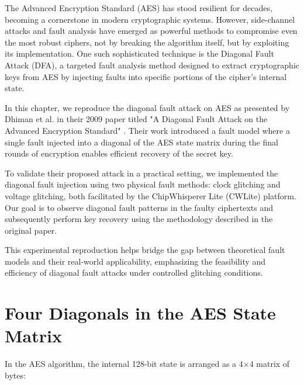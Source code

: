 

The Advanced Encryption Standard (AES) has stood resilient for decades, becoming a cornerstone in modern cryptographic systems. However, side-channel attacks and fault analysis have emerged as powerful methods to compromise even the most robust ciphers, not by breaking the algorithm itself, but by exploiting its implementation. One such sophisticated technique is the Diagonal Fault Attack (DFA), a targeted fault analysis method designed to extract cryptographic keys from AES by injecting faults into specific portions of the cipher’s internal state.

In this chapter, we reproduce the diagonal fault attack on AES as presented by Dhiman et al. in their 2009 paper titled "A Diagonal Fault Attack on the Advanced Encryption Standard" \cite{Saha2009ADF}. Their work introduced a fault model where a single fault injected into a diagonal of the AES state matrix during the final rounds of encryption enables efficient recovery of the secret key.

To validate their proposed attack in a practical setting, we implemented the diagonal fault injection using two physical fault methods: clock glitching and voltage glitching, both facilitated by the ChipWhisperer Lite (CWLite) platform. Our goal is to observe diagonal fault patterns in the faulty ciphertexts and subsequently perform key recovery using the methodology described in the original paper.

This experimental reproduction helps bridge the gap between theoretical fault models and their real-world applicability, emphasizing the feasibility and efficiency of diagonal fault attacks under controlled glitching conditions.

\section{Four Diagonals in the AES State Matrix}

In the AES algorithm, the internal 128-bit state is arranged as a 4×4 matrix of bytes:


